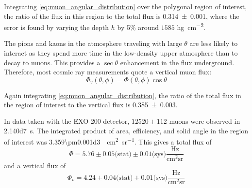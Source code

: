 \documentclass[herrin-thesis.tex]{subfiles}
\begin{document}
Integrating \cref{eq:muon_angular_distribution} over the polygonal region of interest, the ratio of the flux in this region to the total flux is \num{0.314\pm0.001}, where the error is found by varying the depth \(h\) by 5\% around \(1585\) \si{\hecto\gram\per\square\centi\meter}.

The pions and kaons in the atmosphere traveling with large \(\theta\) are less likely to interact as they spend more time in the low-density upper atmosphere than to decay to muons. This provides a \(\sec\theta\) enhancement in the flux underground. Therefore, most cosmic ray measurements quote a vertical muon flux:
\begin{equation}
\label{eq:muon_vfluxdef}
\Phi_v(\theta, \phi) = \Phi(\theta, \phi)\cos\theta
\end{equation}

Again integrating \cref{eq:muon_angular_distribution}, the ratio of the total flux in the region of interest to the vertical flux is \num{0.385\pm0.003}.

In data taken with the EXO-200 detector, \(12520\pm112\) muons were observed in \SI{2.140d7}{\second}. The integrated product of area, efficiency, and solid angle in the region of interest was \SI{3.359\pm0.001d3}{\per\square\centi\meter\per\steradian}. This gives a total flux of
\begin{equation}
\label{eq:muon_flux_result}
\Phi = 5.76\pm0.05\text{(stat)}\pm0.01\text{(sys)}\frac{\text{Hz}}{\text{cm}^2\text{sr}}
\end{equation}
and a vertical flux of
\begin{equation}
\label{eq:muon_vflux_result}
\Phi_v = 4.24\pm0.04\text{(stat)}\pm0.01\text{(sys)}\frac{\text{Hz}}{\text{cm}^2\text{sr}}
\end{equation}

%
%
\end{document}
